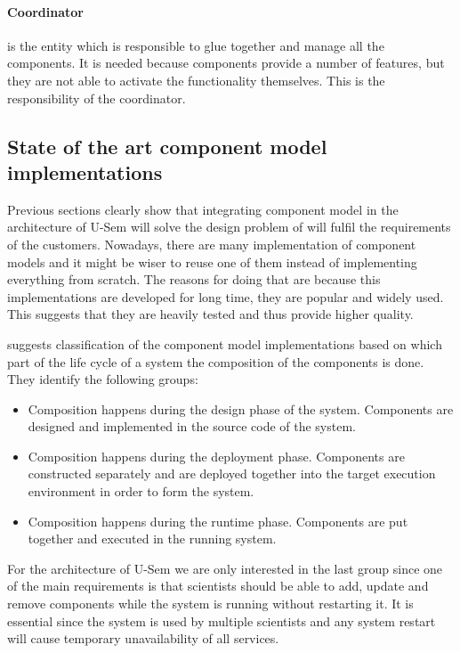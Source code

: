 \paragraph{Coordinator}
	is the entity which is responsible to glue together and manage all the components. It is needed because components provide a number of features, but they are not able to activate the functionality themselves. This is the responsibility of the coordinator.

\subsection{State of the art component model implementations}

Previous sections clearly show that integrating component model in the architecture of U-Sem will solve the design problem of will fulfil the requirements of the customers. Nowadays, there are many implementation of component models and it might be wiser to reuse one of them instead of implementing everything from scratch. The reasons for doing that are because this implementations are developed for long time, they are popular and widely used. This suggests that they are heavily tested and thus provide higher quality. 

\cite{Lau} suggests classification of the component model implementations based on which part of the life cycle of a system the composition of the components is done. They identify the following groups:

\begin{itemize}
	\item  Composition happens during the design phase of the system. Components are designed and implemented in the source code of the system.
	\item  Composition happens during the deployment phase. Components are constructed separately and are deployed together into the target execution environment in order to form the system.
	\item Composition happens during the runtime phase. Components are put together and executed in the running system.
\end{itemize}

For the architecture of U-Sem we are only interested in the last group since one of the main requirements is that scientists should be able to add, update and remove components while the system is running without restarting it. It is essential since the system is used by multiple scientists and any system restart will cause temporary unavailability of all services. 

